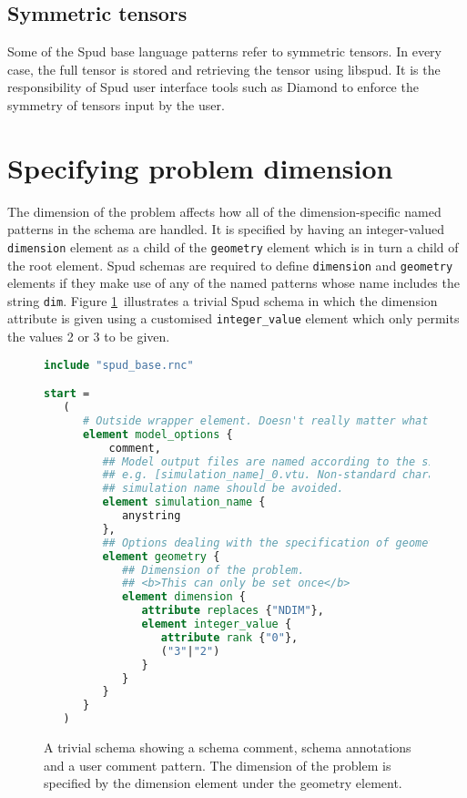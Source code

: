 \documentclass[a4paper, 11pt]{book}
\begin{document}
\subsection{Symmetric tensors}

Some of the Spud base language patterns refer to symmetric tensors. In every
case, the full tensor is stored and retrieving the tensor using libspud. It
is the responsibility of Spud user interface tools such as Diamond to
enforce the symmetry of tensors input by the user.

\section{Specifying problem dimension }

The dimension of the problem affects how all of the dimension-specific named
patterns in the schema are handled. It is specified by having an
integer-valued \lstinline+dimension+ element as a child of the
\lstinline+geometry+ element which is in turn a child of the root
element. Spud schemas are required to define \lstinline+dimension+ and
\lstinline+geometry+ elements if they make use of any of the
named patterns whose name includes the string \verb+dim+. Figure
\ref{fig:schema}\ illustrates a trivial Spud schema in which the dimension
attribute is given using a customised \lstinline+integer_value+ element
which only permits the values 2 or 3 to be given.

\begin{figure}[t]
\begin{lstlisting}[language=rnc,frame=trBL]
include "spud_base.rnc"

start = 
   (
      # Outside wrapper element. Doesn't really matter what the name is.
      element model_options {
          comment,
         ## Model output files are named according to the simulation name, 
         ## e.g. [simulation_name]_0.vtu. Non-standard characters in the 
         ## simulation name should be avoided.
         element simulation_name {
            anystring
         },
         ## Options dealing with the specification of geometry
         element geometry {
            ## Dimension of the problem.
            ## <b>This can only be set once</b>
            element dimension {
               attribute replaces {"NDIM"},
               element integer_value {
                  attribute rank {"0"},
                  ("3"|"2")
               }
            }
         }
      }
   )  
\end{lstlisting}

  \caption{A trivial schema showing a schema comment, schema annotations and
  a user comment pattern. The dimension of the problem is specified by the
  dimension element under the geometry element.}
  \label{fig:schema}

\end{figure}
\end{document}
